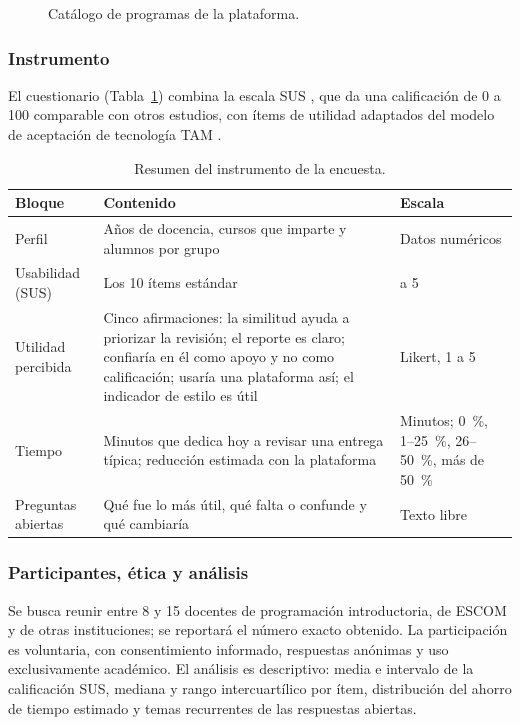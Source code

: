 \begin{figure}[H]
    \centering
    \caption{Catálogo de programas de la plataforma.}
    \label{fig:captura_catalogo}
\end{figure}

\subsubsection{Instrumento}
El cuestionario (Tabla~\ref{tab:instrumento}) combina la escala SUS \cite{Brooke1996SUS}, que da una calificación de 0 a 100 comparable con otros estudios, con ítems de utilidad adaptados del modelo de aceptación de tecnología TAM \cite{Davis1989TAM}.

\begin{table}[H]
    \centering
    \caption{Resumen del instrumento de la encuesta.}
    \label{tab:instrumento}
    \renewcommand{\arraystretch}{1.25}
    \small
    \begin{tabularx}{\textwidth}{|>{\raggedright\arraybackslash}p{3.6cm}|X|>{\raggedright\arraybackslash}p{3.2cm}|}
        \hline
        \textbf{Bloque} & \textbf{Contenido} & \textbf{Escala} \\ \hline
        Perfil & Años de docencia, cursos que imparte y alumnos por grupo & Datos numéricos \\ \hline
        Usabilidad (SUS) & Los 10 ítems estándar & 1 a 5 \\ \hline
        Utilidad percibida & Cinco afirmaciones: la similitud ayuda a priorizar la revisión; el reporte es claro; confiaría en él como apoyo y no como calificación; usaría una plataforma así; el indicador de estilo es útil & Likert, 1 a 5 \\ \hline
        Tiempo & Minutos que dedica hoy a revisar una entrega típica; reducción estimada con la plataforma & Minutos; 0~\%, 1--25~\%, 26--50~\%, más de 50~\% \\ \hline
        Preguntas abiertas & Qué fue lo más útil, qué falta o confunde y qué cambiaría & Texto libre \\ \hline
    \end{tabularx}
\end{table}

\subsubsection{Participantes, ética y análisis}
Se busca reunir entre 8 y 15 docentes de programación introductoria, de ESCOM y de otras instituciones; se reportará el número exacto obtenido. La participación es voluntaria, con consentimiento informado, respuestas anónimas y uso exclusivamente académico. El análisis es descriptivo: media e intervalo de la calificación SUS, mediana y rango intercuartílico por ítem, distribución del ahorro de tiempo estimado y temas recurrentes de las respuestas abiertas.

